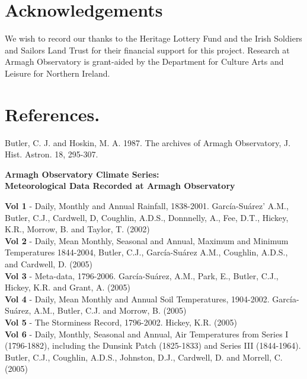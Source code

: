 \documentclass[12pt, epsfig, graphics, rotating, epsf,tifff]{article}
\begin{document}
\vspace{-1cm}
 \section{Acknowledgements}
 
We wish to record our thanks to the Heritage Lottery Fund and the Irish Soldiers
and Sailors Land Trust for their financial support for this project. Research at
Armagh Observatory is grant-aided by the Department for Culture Arts and Leisure
for Northern Ireland.

\vspace{-0.3cm}
\section{References.}

Butler, C. J. and Hoskin, M. A. 1987. The archives of Armagh Observatory, J. Hist.
Astron. 18, 295-307. 


\medskip

\medskip

\noindent
{\bf Armagh Observatory Climate Series:\\ 
Meteorological Data Recorded at Armagh Observatory}

\medskip

\noindent
{\bf Vol 1} - Daily, Monthly and Annual Rainfall,
1838-2001. Garc\'{i}a-Su\'{a}rez' A.M., Butler, C.J., Cardwell, D, Coughlin, A.D.S., Donnnelly,
A., Fee, D.T., Hickey, K.R., Morrow, B. and Taylor, T. (2002)\\

\noindent
{\bf Vol 2} - Daily, Mean Monthly, Seasonal and Annual, Maximum and Minimum Temperatures
1844-2004, Butler, C.J., Garc\'{i}a-Su\'{a}rez A.M., Coughlin, A.D.S.,  and Cardwell, D.
(2005)\\

\noindent
{\bf Vol 3} - Meta-data, 1796-2006. Garc\'{i}a-Su\'{a}rez, A.M., Park, E., Butler, C.J., Hickey, K.R. 
and Grant, A. (2005)\\

\noindent
{\bf Vol 4} - Daily, Mean Monthly and Annual Soil Temperatures, 1904-2002.
Garc\'{i}a-Su\'{a}rez, A.M., Butler, C.J. and Morrow, B. (2005)\\

\noindent
{\bf Vol 5} - The Storminess Record, 1796-2002. Hickey, K.R.
(2005)\\

\noindent
{\bf Vol 6} - Daily, Monthly, Seasonal and Annual, Air Temperatures from Series I
(1796-1882), including the Dunsink Patch (1825-1833) and Series III (1844-1964).
Butler, C.J., Coughlin, A.D.S., Johnston, D.J., Cardwell, D. and Morrell, C. (2005)\\
\end{document}
